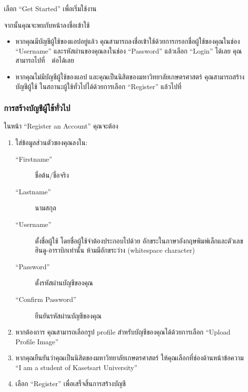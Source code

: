 เลือก ``Get Started'' เพื่อเริ่มใช้งาน

จากนั้นคุณจะพบกับหน้าลงชื่อเข้าใช้


\begin{itemize}
    \item หากคุณมีบัญชีผู้ใช้ของแอปอยู่แล้ว
คุณสามารถลงชื่อเข้าใช้ด้วยการกรอกชื่อผู้ใช้ของคุณในช่อง ``Username'' และรหัสผ่านของคุณลงในช่อง ``Password''
แล้วเลือก ``Login'' ได้เลย คุณสามารถไปที่~~ต่อได้เลย
    \item หากคุณไม่มีบัญชีผู้ใช้ของแอป และคุณเป็นนิสิตของมหาวิทยาลัยเกษตรศาสตร์ คุณสามารถสร้างบัญชีผู้ใช้
ในสถานะผู้ใช้ทั่วไปได้ด้วยการเลือก ``Register'' แล้วไปที่ 
\end{itemize}

\subsubsection{การสร้างบัญชีผู้ใช้ทั่วไป}\label{subsubsec:register-consumer-acct}

ในหน้า ``Register an Account'' คุณจะต้อง


\begin{enumerate}
    \item ใส่ข้อมูลส่วนตัวของคุณลงใน:
        \begin{description}
            \item[``Firstname''] ชื่อต้น/ชื่อจริง
            \item[``Lastname''] นามสกุล
            \item[``Username''] \parbox[t]{0.5\textwidth}{ตั้งชื่อผู้ใช้ โดยชื่อผู้ใช้จำต้องประกอบไปด้วย อักขระในภาษาอังกฤษพิมพ์เล็กและตัวเลขฮินดู-อาราบิกเท่านั้น ห้ามมีอักขระว่าง (whitespace character)}
            \item[``Password''] ตั้งรหัสผ่านบัญชีของคุณ
            \item[``Confirm Password''] ยืนยันรหัสผ่านบัญชีของคุณ
        \end{description}
    \item หากต้องการ คุณสามารถเลือกรูป profile สำหรับบัญชีของคุณได้ด้วยการเลือก ``Upload Profile Image''
    \item หากคุณยืนยันว่าคุณเป็นนิสิตของมหาวิทยาลัยเกษตรศาสตร์ ให้คุณเลือกที่ช่องด้านหน้าข้อความ ``I am a student of Kasetsart University''
    \item เลือก ``Register'' เพื่อเสร็จสิ้นการสร้างบัญชี
\end{enumerate}

